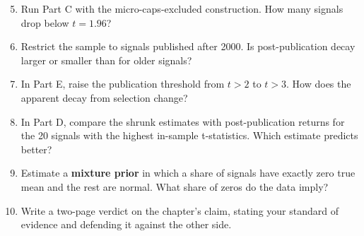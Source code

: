 \begin{enumerate}
  \setcounter{enumi}{4}
  \item Run Part C with the micro-caps-excluded construction. How many signals drop below $t = 1.96$?
  \item Restrict the sample to signals published after 2000. Is post-publication decay larger or smaller than for older signals?
  \item In Part E, raise the publication threshold from $t > 2$ to $t > 3$. How does the apparent decay from selection change?
  \item In Part D, compare the shrunk estimates with post-publication returns for the 20 signals with the highest in-sample t-statistics. Which estimate predicts better?
  \item Estimate a \textbf{mixture prior} in which a share of signals have exactly zero true mean and the rest are normal. What share of zeros do the data imply?
  \item Write a two-page verdict on the chapter's claim, stating your standard of evidence and defending it against the other side.
\end{enumerate}
